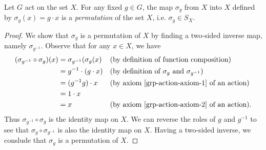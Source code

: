 \begin{prop}\label{sigma-is-a-permutation}
Let $G$ act on the set $X$.  For any fixed $g \in G$, the map $\sigma_g$ from $X$ into $X$ defined by $\sigma_g (x) = g \cdot x$ is a \textit{permutation} of the set $X$, i.e. $\sigma_g \in S_X$.
\end{prop}
\begin{proof}
We show that $\sigma_g$ is a permutation of $X$ by finding a two-sided inverse map, namely $\sigma_{g^{-1}}$. Observe that for any $x \in X$, we have
\begin{align*}
(\sigma_{g^{-1}} \circ \sigma_g) (x) &= \sigma_{g^{-1}} ( \sigma_g (x) && \text{(by definition of function composition)} \\
					&= g^{-1} \cdot (g \cdot x) && \text{(by definition of $\sigma_g$ and $\sigma_{g^{-1}}$)} \\
					&= (g^{-1}g) \cdot x &&\text{(by axiom \ref{grp-action-axiom-1} of an action)} \\
					&= 1 \cdot x \\
					&= x &&\text{(by axiom \ref{grp-action-axiom-2} of an action)}.
\end{align*}
Thus $\sigma_{g^{-1}} \circ \sigma_g$ is the identity map on $X$. We can reverse the roles of $g$ and $g^{-1}$ to see that $\sigma_g \circ \sigma_{g^{-1}}$ is also the identity map on $X$.  Having a two-sided inverse, we conslude that $\sigma_g$ is a permutation of $X$.
\end{proof}

